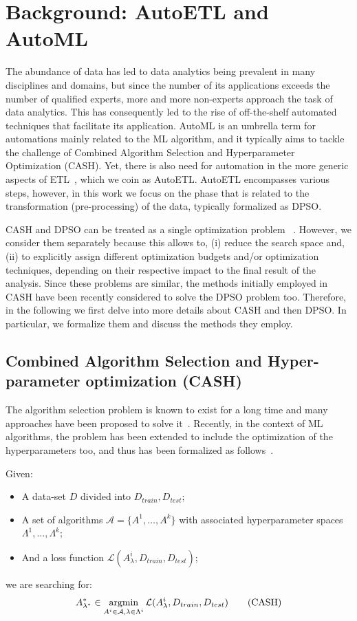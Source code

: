\section{Background: AutoETL and AutoML}
\label{sec:background}


The abundance of data has led to data analytics being prevalent in many disciplines and domains, but since the number of its applications exceeds the number of qualified experts, more and more non-experts approach the task of data analytics. This has consequently led to the rise of off-the-shelf automated techniques that facilitate its application.
AutoML is an umbrella term for automations mainly related to the ML algorithm, and it typically aims to tackle the challenge of Combined Algorithm Selection and Hyperparameter Optimization (CASH). Yet, there is also need for automation in the more generic aspects of ETL~\cite{Munoz09DOLAP}, which we coin as AutoETL. AutoETL encompasses various steps, however, in this work we focus on the phase that is related to the transformation (pre-processing) of the data, typically formalized as DPSO.

CASH and DPSO can be treated as a single optimization problem ~\cite{auto_weka, auto_sklearn}. However, we consider them separately because this allows to, (i) reduce the search space and, (ii) to explicitly assign different optimization budgets and/or optimization techniques, depending on their respective impact to the final result of the analysis.
Since these problems are similar, the methods initially employed in CASH have been recently considered to solve the DPSO problem too. Therefore, in the following we first delve into more details about CASH and then DPSO. In particular, we formalize them and discuss the methods they employ.

\subsection{Combined Algorithm Selection and Hyper-parameter optimization (CASH)}

The algorithm selection problem is known to exist for a long time and many approaches have been proposed to solve it~\cite{Serban13survey}. Recently, in the context of ML algorithms, the problem has been extended to include the optimization of the hyperparameters too, and thus has been formalized as follows~\cite{auto_weka}.

Given:
\begin{itemize}
    \item A data-set $D$ divided into $D_{train}, D_{test}$;
    \item A set of algorithms $\mathcal{A} = \{A^{1}, \dots , A^{k}\}$ with associated hyperparameter spaces $\Lambda^{1}, \dots, \Lambda^{k}$;
    \item And a loss function $\mathcal{L}(A^{i}_\lambda,D_{train},D_{test})$;
\end{itemize}
we are searching for:
\begin{equation}
    A^{\ast}_{\lambda^{\ast}} \in \mathop{\mathrm{argmin}}\limits_{A^i \in \mathcal{A}, \lambda \in \Lambda^i} \mathcal{L}(A^i_\lambda,D_{train},D_{test}) \tag{CASH}
\end{equation}

